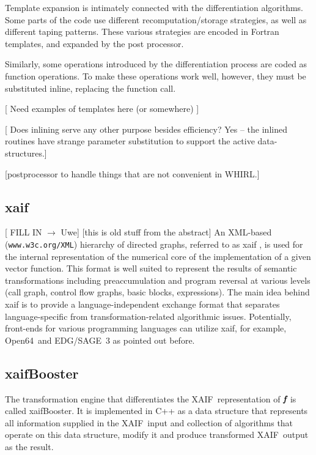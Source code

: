 \documentclass[acmtocl,acmnow]{acmtrans2m}
\newcommand{\OpenSixtyFour}{Open64}
\newcommand{\xaif}{XAIF}
\newcommand{\xaifBooster}{xaifBooster}
\newcommand{\bmf}{\mbox{\bf\em f}}
\begin{document}
Template expansion is intimately connected with the differentiation
algorithms. Some parts of the code use different recomputation/storage
strategies, as well as different taping patterns. These various
strategies are encoded in Fortran templates, and expanded by the
post processor.

Similarly, some operations introduced by the differentiation process
are coded as function operations. To make these operations work well,
however, they must be substituted inline, replacing the function call.

{\color{Red}
[ Need examples of templates here (or somewhere) ]

[ Does inlining serve any other purpose besides efficiency?  Yes --
the inlined routines have strange parameter substitution to support
the active data-structures.]

[postprocessor to handle things that are not convenient in WHIRL.]
}

\subsection{xaif} \label{ssec:xaif}
{\color{Red} [ FILL IN $\to$ Uwe] } 
{\color{Blue} [this is old stuff from the abstract] 
An XML-based ({\tt www.w3c.org/XML}) hierarchy of directed graphs, referred to as xaif 
\cite{HNN02}, is used for the 
internal representation of the numerical core of the implementation
of a given vector function. This format is 
well suited to represent the results of  semantic transformations including 
preaccumulation \cite{BiHa96,CDB96,GrRe91} and 
program reversal \cite{Gri92,WaGr01} at various levels (call graph, control 
flow graphs, basic blocks, expressions). 
The main idea behind xaif is to provide a language-independent exchange
format that separates language-specific from transformation-related 
algorithmic issues. Potentially, front-ends for various programming languages 
can utilize xaif, for example, \OpenSixtyFour\ and EDG/SAGE~3 as pointed out before.
}
\subsection{\xaifBooster} 
The transformation engine that differentiates the \xaif\ representation of 
$\bmf$ is called \xaifBooster. It is implemented in C++ as a 
data structure that represents all information supplied in the \xaif\ input 
and collection of algorithms that operate on this data structure, modify 
it and produce transformed  \xaif\ output as the result. 
\end{document}
